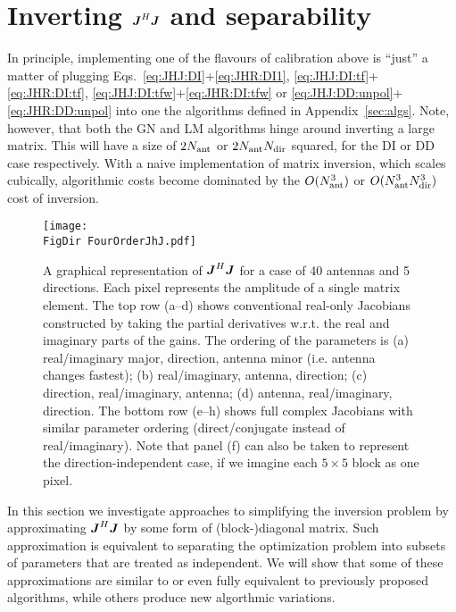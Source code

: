 \documentclass[useAMS,usenatbib]{mn2e}
\newcommand{\mat}[1]{{\bmath{#1}}}
\newcommand{\JJ}{\mat{J}} %
\newcommand{\JHJ}{\JJ^H\JJ} %
\newcommand{\FigDir}{../Figures/}
\begin{document}
\section{Inverting $\JJ^H\JJ$ and separability}
\label{sec:separability}

In principle, implementing one of the flavours of calibration above is ``just'' a matter of  
plugging Eqs.~\ref{eq:JHJ:DI}+\ref{eq:JHR:DI1}, \ref{eq:JHJ:DI:tf}+\ref{eq:JHR:DI:tf},
\ref{eq:JHJ:DI:tfw}+\ref{eq:JHR:DI:tfw} or \ref{eq:JHJ:DD:unpol}+\ref{eq:JHR:DD:unpol} into one the algorithms defined in 
Appendix~\ref{sec:algs}. Note, however, that both the GN and LM algorithms hinge around 
inverting a large matrix. This will have a size of $2N_\mathrm{ant}$ or $2N_\mathrm{ant}N_\mathrm{dir}$ squared, 
for the DI or DD case respectively. With a naive implementation of matrix inversion, 
which scales cubically, algorithmic costs become dominated by the $O(N_\mathrm{ant}^3)$ or $O(N_\mathrm{ant}^3N_\mathrm{dir}^3)$
cost of inversion.


\begin{figure*}
\begin{center}
\texttt{[image: \\FigDir FourOrderJhJ.pdf]}
\caption{\label{fig:JHJ}A graphical representation of $\JHJ$ for a case of 
40 antennas and 5 directions. Each pixel represents the amplitude of a single matrix element.
The top row (a--d) shows conventional real-only Jacobians constructed by taking the partial derivatives w.r.t. 
the real and imaginary parts of the gains. The ordering of the parameters is (a) real/imaginary major, 
direction, antenna minor (i.e. antenna changes fastest); (b) real/imaginary, antenna, direction; (c) direction, 
real/imaginary, antenna; (d) antenna, real/imaginary, direction. The bottom row (e--h) shows full complex Jacobians with similar parameter ordering (direct/conjugate instead of real/imaginary). Note that panel (f) can also be taken to represent the direction-independent case, if we imagine each $5\times5$ block as one pixel.}
\end{center}
\end{figure*}



In this section we investigate approaches to simplifying the inversion problem by approximating
$\JJ^H\JJ$ by some form of (block-)diagonal matrix. Such approximation is equivalent to separating
the optimization problem into subsets of parameters that are treated as independent. We will show 
that some of these approximations are similar to or even fully equivalent to previously proposed 
algorithms, while others produce new algorthmic variations.
\end{document}
